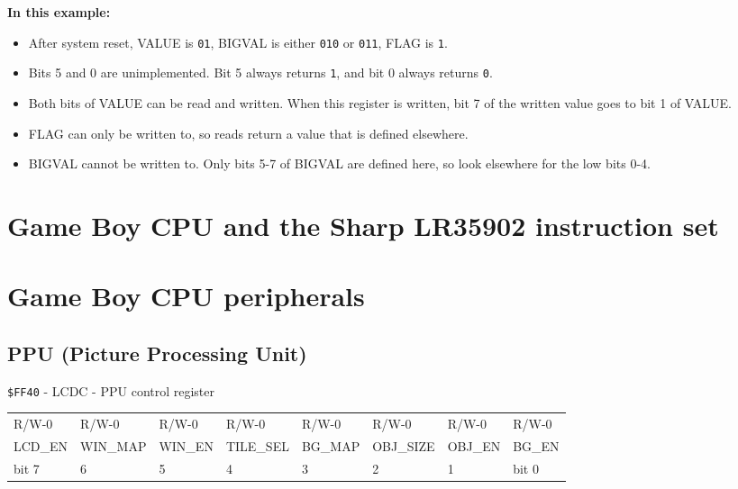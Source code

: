 \documentclass[a4paper, draft, oneside]{memoir}
\begin{document}
\begin{register}[H]
  \vspace{3mm}
  \textbf{In this example:}
  \begin{itemize}
    \item{After system reset, VALUE is \texttt{01}, BIGVAL is either \texttt{010} or \texttt{011}, FLAG is \texttt{1}.}
    \item{Bits 5 and 0 are unimplemented. Bit 5 always returns \texttt{1}, and bit 0 always returns \texttt{0}.}
    \item{Both bits of VALUE can be read and written. When this register is written, bit 7 of the written value goes to bit 1 of VALUE.}
    \item{FLAG can only be written to, so reads return a value that is defined elsewhere.}
    \item{BIGVAL cannot be written to. Only bits 5-7 of BIGVAL are defined here, so look elsewhere for the low bits 0-4.}
  \end{itemize}
\end{register}

\part{Game Boy CPU and the Sharp LR35902 instruction set}

\part{Game Boy CPU peripherals}

\chapter{PPU (Picture Processing Unit)}

\begin{register}[H]
  \caption{\texttt{\$FF40} - LCDC - PPU control register}
  {
    \ttfamily
    \begin{tabu} to \textwidth {|X[c]|X[c]|X[c]|X[c]|X[c]|X[c]|X[c]|X[c]|}
      \everyrow{\hline}
      \hline
      R/W-0    & R/W-0      & R/W-0     & R/W-0      & R/W-0       & R/W-0         & R/W-0       & R/W-0      \\
      LCD\_EN & WIN\_MAP & WIN\_EN & TILE\_SEL & BG\_MAP & OBJ\_SIZE & OBJ\_EN & BG\_EN \\
      \rowfont{\rmfamily\small}
      bit 7    & 6          & 5         & 4          & 3           & 2             & 1           & bit 0      \\
      \hline
    \end{tabu}
  }
\end{register}
\end{document}
